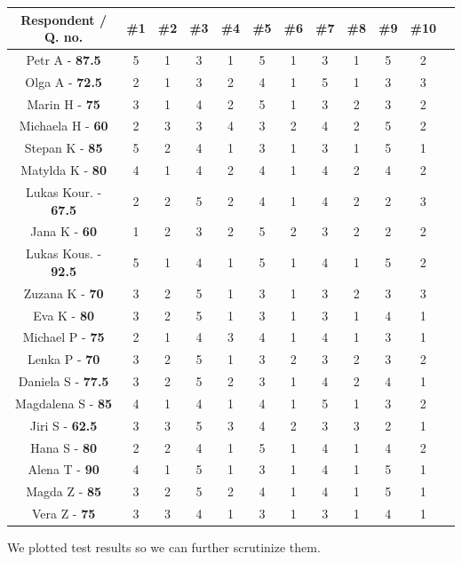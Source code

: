 \begin{tabular}{ |c|c|c|c|c|c|c|c|c|c|c|c| } 
    \hline
    Respondent / Q. no. & \#1 & \#2& \#3& \#4& \#5& \#6& \#7& \#8& \#9& \#10 \\
    \hline
    Petr A - \textbf{87.5}     & 5 & 1& 3& 1& 5& 1& 3& 1& 5& 2 \\ 
    Olga A - \textbf{72.5}     & 2 & 1& 3& 2& 4& 1& 5& 1& 3& 3 \\ 
    Marin H - \textbf{75}    & 3 & 1& 4& 2& 5& 1& 3& 2& 3& 2 \\ 
    Michaela H - \textbf{60} & 2 & 3& 3& 4& 3& 2& 4& 2& 5& 2 \\ 
    Stepan K - \textbf{85}   & 5 & 2& 4& 1& 3& 1& 3& 1& 5& 1 \\ 
    Matylda K - \textbf{80}  & 4 & 1& 4& 2& 4& 1& 4& 2& 4& 2 \\ 
    Lukas Kour. - \textbf{67.5} & 2 & 2& 5& 2& 4& 1& 4& 2& 2& 3 \\ 
    Jana K - \textbf{60}    & 1 & 2& 3& 2& 5& 2& 3& 2& 2& 2 \\ 
    Lukas Kous. - \textbf{92.5} & 5 & 1& 4& 1& 5& 1& 4& 1& 5& 2 \\ 
    Zuzana K - \textbf{70}   & 3 & 2& 5& 1& 3& 1& 3& 2& 3& 3 \\ 
    Eva K - \textbf{80}      & 3 & 2& 5& 1& 3& 1& 3& 1& 4& 1 \\ 
    Michael P - \textbf{75}  & 2 & 1& 4& 3& 4& 1& 4& 1& 3& 1 \\ 
    Lenka P - \textbf{70}    & 3 & 2& 5& 1& 3& 2& 3& 2& 3& 2 \\ 
    Daniela S - \textbf{77.5}  & 3 & 2& 5& 2& 3& 1& 4& 2& 4& 1 \\ 
    Magdalena S - \textbf{85} & 4 & 1& 4& 1& 4& 1& 5& 1& 3& 2 \\ 
    Jiri S - \textbf{62.5}     & 3 & 3& 5& 3& 4& 2& 3& 3& 2& 1 \\ 
    Hana S - \textbf{80}     & 2 & 2& 4& 1& 5& 1& 4& 1& 4& 2 \\ 
    Alena T - \textbf{90}    & 4 & 1& 5& 1& 3& 1& 4& 1& 5& 1 \\ 
    Magda Z - \textbf{85}    & 3 & 2& 5& 2& 4& 1& 4& 1& 5& 1 \\ 
    Vera Z - \textbf{75}     & 3 & 3& 4& 1& 3& 1& 3& 1& 4& 1 \\ 
    \hline
\end{tabular}
\newpage
We plotted test results so we can further scrutinize them. 
